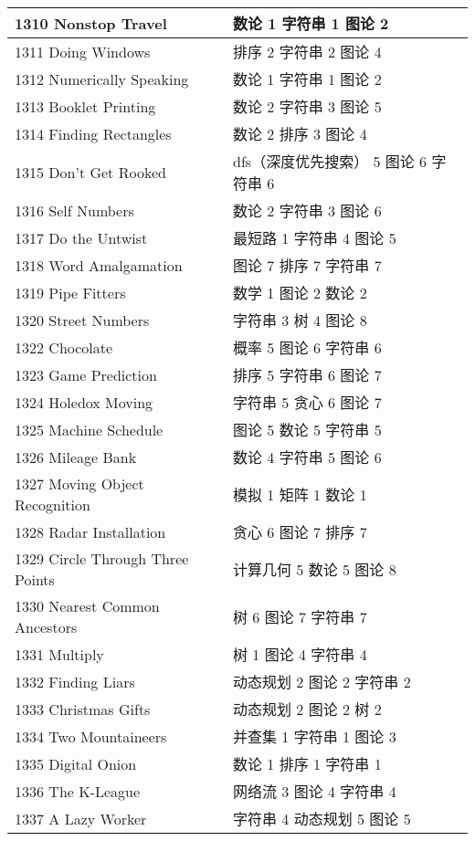 \begin{longtable}{| p{} | p{} |}
 1310 Nonstop Travel  & 数论 1 字符串 1 图论 2 \\ \hline
 1311 Doing Windows  & 排序 2 字符串 2 图论 4 \\ \hline
 1312 Numerically Speaking  & 数论 1 字符串 1 图论 2 \\ \hline
 1313 Booklet Printing  & 数论 2 字符串 3 图论 5 \\ \hline
 1314 Finding Rectangles  & 数论 2 排序 3 图论 4 \\ \hline
 1315 Don't Get Rooked  & dfs（深度优先搜索） 5 图论 6 字符串 6 \\ \hline
 1316 Self Numbers  & 数论 2 字符串 3 图论 6 \\ \hline
 1317 Do the Untwist  & 最短路 1 字符串 4 图论 5 \\ \hline
 1318 Word Amalgamation  & 图论 7 排序 7 字符串 7 \\ \hline
 1319 Pipe Fitters  & 数学 1 图论 2 数论 2 \\ \hline
 1320 Street Numbers  & 字符串 3 树 4 图论 8 \\ \hline
 1322 Chocolate  & 概率 5 图论 6 字符串 6 \\ \hline
 1323 Game Prediction  & 排序 5 字符串 6 图论 7 \\ \hline
 1324 Holedox Moving  & 字符串 5 贪心 6 图论 7 \\ \hline
 1325 Machine Schedule  & 图论 5 数论 5 字符串 5 \\ \hline
 1326 Mileage Bank  & 数论 4 字符串 5 图论 6 \\ \hline
 1327 Moving Object Recognition  & 模拟 1 矩阵 1 数论 1 \\ \hline
 1328 Radar Installation  & 贪心 6 图论 7 排序 7 \\ \hline
 1329 Circle Through Three Points  & 计算几何 5 数论 5 图论 8 \\ \hline
 1330 Nearest Common Ancestors  & 树 6 图论 7 字符串 7 \\ \hline
 1331 Multiply  & 树 1 图论 4 字符串 4 \\ \hline
 1332 Finding Liars  & 动态规划 2 图论 2 字符串 2 \\ \hline
 1333 Christmas Gifts  & 动态规划 2 图论 2 树 2 \\ \hline
 1334 Two Mountaineers  & 并查集 1 字符串 1 图论 3 \\ \hline
 1335 Digital Onion  & 数论 1 排序 1 字符串 1 \\ \hline
 1336 The K-League  & 网络流 3 图论 4 字符串 4 \\ \hline
 1337 A Lazy Worker  & 字符串 4 动态规划 5 图论 5 \\ \hline

\end{longtable}
